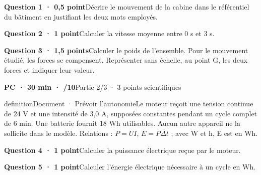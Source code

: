 \par\addvspace{3mm}\noindent\begin{minipage}{\linewidth}\textbf{Question 1 · 0,5 point}\quad Décrire le mouvement de la cabine dans le référentiel du bâtiment en justifiant les deux mots employés.\par\end{minipage}\par
\par\addvspace{3mm}\noindent\begin{minipage}{\linewidth}\textbf{Question 2 · 1 point}\quad Calculer la vitesse moyenne entre 0 s et 3 s.\par\end{minipage}\par
\par\addvspace{3mm}\noindent\begin{minipage}{\linewidth}\textbf{Question 3 · 1,5 points}\quad Calculer le poids de l’ensemble. Pour le mouvement étudié, les forces se compensent. Représenter sans échelle, au point G, les deux forces et indiquer leur valeur.\par\end{minipage}\par
\vfill{}
\textbf{PC · 30 min · /10}\hfill Partie 2/3 · 3 points scientifiques
\begin{pcEncadre}{definition}{Document · Prévoir l’autonomie}Le moteur reçoit une tension continue de 24 V et une intensité de 3,0 A, supposées constantes pendant un cycle complet de 6 min. Une batterie fournit 18 Wh utilisables. Aucun autre appareil ne la sollicite dans le modèle. Relations : $P=UI$, $E=P\Delta t$ ; avec W et h, E est en Wh.\end{pcEncadre}
\par\addvspace{3mm}\noindent\begin{minipage}{\linewidth}\textbf{Question 4 · 1 point}\quad Calculer la puissance électrique reçue par le moteur.\par\end{minipage}\par
\par\addvspace{3mm}\noindent\begin{minipage}{\linewidth}\textbf{Question 5 · 1 point}\quad Calculer l’énergie électrique nécessaire à un cycle en Wh.\par\end{minipage}\par
